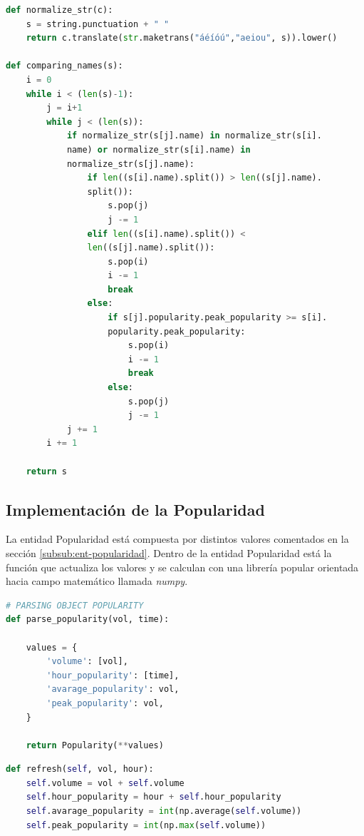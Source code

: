 \begin{lstlisting}[caption=Comrobación de los nombres de tendencia,          label={lst:listing-python},language=Python]
def normalize_str(c):
    s = string.punctuation + " "
    return c.translate(str.maketrans("áéíóú","aeiou", s)).lower()

def comparing_names(s):
    i = 0
    while i < (len(s)-1):
        j = i+1
        while j < (len(s)):
            if normalize_str(s[j].name) in normalize_str(s[i].
            name) or normalize_str(s[i].name) in 
            normalize_str(s[j].name):
                if len((s[i].name).split()) > len((s[j].name).
                split()):
                    s.pop(j)
                    j -= 1
                elif len((s[i].name).split()) < 
                len((s[j].name).split()):
                    s.pop(i)
                    i -= 1
                    break
                else:
                    if s[j].popularity.peak_popularity >= s[i].
                    popularity.peak_popularity:
                        s.pop(i)
                        i -= 1
                        break
                    else:
                        s.pop(j)
                        j -= 1
            j += 1
        i += 1

    return s
\end{lstlisting}

\subsection{Implementación de la Popularidad}
La entidad Popularidad está compuesta por distintos valores comentados en la sección \ref{subsub:ent-popularidad}. Dentro de la entidad Popularidad está la función que actualiza los valores y se calculan con una librería popular orientada hacia campo matemático llamada \textit{numpy}.

\begin{lstlisting}[caption=Estructuración de la popularidad,          label={lst:listing-python},language=Python]
# PARSING OBJECT POPULARITY
def parse_popularity(vol, time):

    values = {
        'volume': [vol],
        'hour_popularity': [time],
        'avarage_popularity': vol,
        'peak_popularity': vol,
    }

    return Popularity(**values)
\end{lstlisting}

\begin{lstlisting}[caption=Actualización de la popularidad,          label={lst:listing-python},language=Python]
def refresh(self, vol, hour):
    self.volume = vol + self.volume
    self.hour_popularity = hour + self.hour_popularity
    self.avarage_popularity = int(np.average(self.volume))
    self.peak_popularity = int(np.max(self.volume))
\end{lstlisting}

